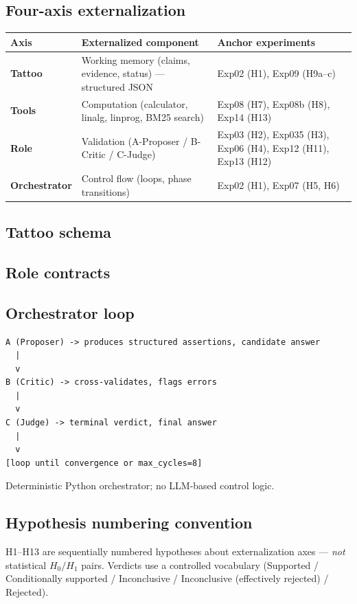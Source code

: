 \documentclass[11pt]{article}
\begin{document}
\subsection{Four-axis externalization}

\begin{table}[h]
\centering
\small
\begin{tabular}{@{}lll@{}}
\toprule
Axis & Externalized component & Anchor experiments \\
\midrule
\textbf{Tattoo} & Working memory (claims, evidence, status) --- structured JSON & Exp02 (H1), Exp09 (H9a--c) \\
\textbf{Tools} & Computation (calculator, linalg, linprog, BM25 search) & Exp08 (H7), Exp08b (H8), Exp14 (H13) \\
\textbf{Role} & Validation (A-Proposer / B-Critic / C-Judge) & Exp03 (H2), Exp035 (H3), Exp06 (H4), Exp12 (H11), Exp13 (H12) \\
\textbf{Orchestrator} & Control flow (loops, phase transitions) & Exp02 (H1), Exp07 (H5, H6) \\
\bottomrule
\end{tabular}
\end{table}

\subsection{Tattoo schema}

\subsection{Role contracts}

\subsection{Orchestrator loop}
\begin{lstlisting}
A (Proposer) -> produces structured assertions, candidate answer
  |
  v
B (Critic) -> cross-validates, flags errors
  |
  v
C (Judge) -> terminal verdict, final answer
  |
  v
[loop until convergence or max_cycles=8]
\end{lstlisting}

Deterministic Python orchestrator; no LLM-based control logic.

\subsection{Hypothesis numbering convention}
H1--H13 are sequentially numbered hypotheses about externalization axes --- \emph{not} statistical $H_0/H_1$ pairs. Verdicts use a controlled vocabulary (Supported / Conditionally supported / Inconclusive / Inconclusive (effectively rejected) / Rejected).
\end{document}
